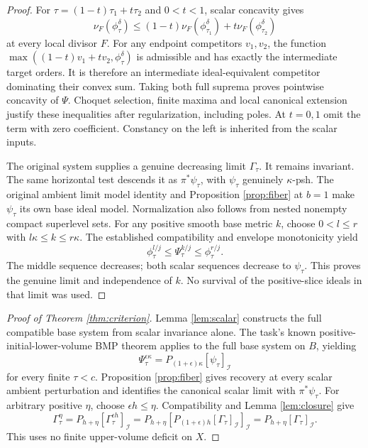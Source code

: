 \documentclass[11pt]{article}
\newcommand{\PI}[2]{P_{#1}[#2]_{\mathcal I}}
\begin{document}
\begin{proof}
For $\tau=(1-t)\tau_1+t\tau_2$ and $0<t<1$, scalar concavity gives
\[
 \nu_F(\phi_\tau^\delta)
 \leq(1-t)\nu_F(\phi_{\tau_1}^\delta)
       +t\nu_F(\phi_{\tau_2}^\delta)
\]
at every local divisor $F$. For any endpoint competitors $v_1,v_2$, the
function $\max((1-t)v_1+tv_2,\phi_\tau^\delta)$ is admissible and
has exactly the intermediate target orders. It is therefore an
intermediate ideal-equivalent competitor dominating their convex sum.
Taking both full suprema proves pointwise concavity of $\Psi$.
Choquet selection, finite maxima and local canonical extension justify
these inequalities after regularization, including poles. At $t=0,1$
omit the term with zero coefficient. Constancy on the left is inherited
from the scalar inputs.

The original system supplies a genuine decreasing limit $\Gamma_\tau$.
It remains invariant. The same horizontal test descends it as
$\pi^*\psi_\tau$, with $\psi_\tau$ genuinely $\kappa$-psh.
The original ambient limit model identity and Proposition
\ref{prop:fiber} at $b=1$ make $\psi_\tau$ its own base ideal model.
Normalization also follows from nested nonempty compact superlevel sets.
For any positive smooth base metric $k$, choose $0<l\leq r$ with
$l\kappa\leq k\leq r\kappa$. The established compatibility and
envelope monotonicity yield
\[
 \phi_\tau^{l/j}\leq\Psi_\tau^{k/j}\leq\phi_\tau^{r/j}.
\]
The middle sequence decreases; both scalar sequences decrease to
$\psi_\tau$. This proves the genuine limit and independence of $k$.
No survival of the positive-slice ideals in that limit was used.
\end{proof}

\begin{proof}[Proof of Theorem \ref{thm:criterion}]
Lemma \ref{lem:scalar} constructs the full compatible base system from
scalar invariance alone.
The task's known positive-initial-lower-volume BMP theorem applies to
the full base system on $B$, yielding
\[
 \Psi_\tau^{\epsilon\kappa}
       =\PI{(1+\epsilon)\kappa}{\psi_\tau}
\]
for every finite $\tau<c$. Proposition \ref{prop:fiber} gives recovery
at every scalar ambient perturbation and identifies the canonical scalar
limit with $\pi^*\psi_\tau$. For arbitrary positive $\eta$, choose
$\epsilon h\leq\eta$. Compatibility and Lemma \ref{lem:closure} give
\[
 \Gamma_\tau^\eta
 =\PI{h+\eta}{\Gamma_\tau^{\epsilon h}}
 =\PI{h+\eta}{\PI{(1+\epsilon)h}{\Gamma_\tau}}
 =\PI{h+\eta}{\Gamma_\tau}.
\]
This uses no finite upper-volume deficit on $X$.
\end{proof}
\end{document}
